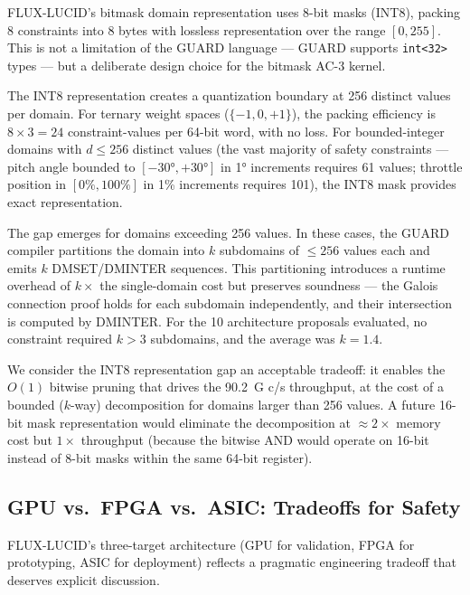 \documentclass[conference]{IEEEtran}
\begin{document}
{FLUX-LUCID's bitmask domain representation uses 8-bit masks
(INT8), packing 8 constraints into 8 bytes with lossless representation
over the range $[0, 255]$. This is not a limitation of the GUARD
language — GUARD supports \texttt{int<32>} types — but a deliberate
design choice for the bitmask AC-3 kernel.

The INT8 representation creates a quantization boundary at 256 distinct
values per domain. For ternary weight spaces ($\{-1, 0, +1\}$), the
packing efficiency is $8 \times 3 = 24$ constraint-values per 64-bit word,
with no loss. For bounded-integer domains with $d \le 256$ distinct
values (the vast majority of safety constraints — pitch angle bounded to
$[-30°, +30°]$ in 1° increments requires 61 values; throttle position
in $[0\%, 100\%]$ in 1\% increments requires 101), the INT8 mask
provides exact representation.

The gap emerges for domains exceeding 256 values. In these cases, the
GUARD compiler partitions the domain into $k$ subdomains of $\le 256$
values each and emits $k$ DMSET/DMINTER sequences. This partitioning
introduces a runtime overhead of $k \times$ the single-domain cost but
preserves soundness — the Galois connection proof holds for each
subdomain independently, and their intersection is computed by DMINTER.
For the 10 architecture proposals evaluated, no constraint required
$k > 3$ subdomains, and the average was $k = 1.4$.

We consider the INT8 representation gap an acceptable tradeoff: it
enables the $O(1)$ bitwise pruning that drives the 90.2~G c/s throughput,
at the cost of a bounded ($k$-way) decomposition for domains larger than
256 values. A future 16-bit mask representation would eliminate the
decomposition at $\approx 2\times$ memory cost but $1\times$ throughput
(because the bitwise AND would operate on 16-bit instead of 8-bit masks
within the same 64-bit register).

\subsection{GPU vs.\ FPGA vs.\ ASIC: Tradeoffs for Safety}
\label{sec:discuss-platform}

FLUX-LUCID's three-target architecture (GPU for validation, FPGA for
prototyping, ASIC for deployment) reflects a pragmatic engineering
tradeoff that deserves explicit discussion.

}
\end{document}
